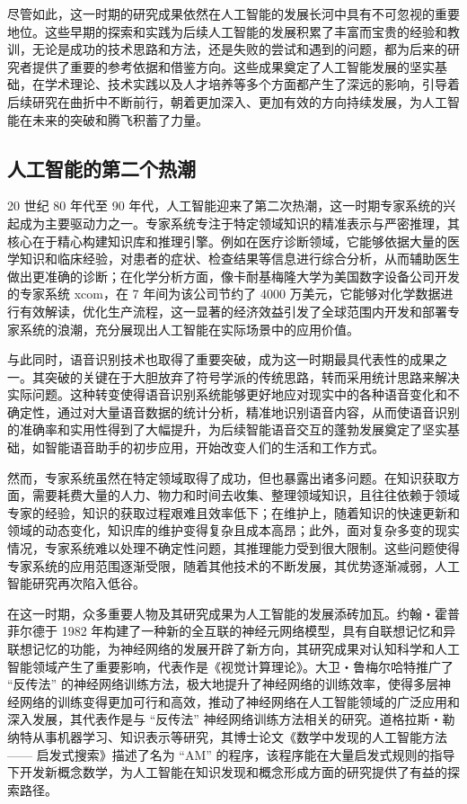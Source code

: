 尽管如此，这一时期的研究成果依然在人工智能的发展长河中具有不可忽视的重要地位。这些早期的探索和实践为后续人工智能的发展积累了丰富而宝贵的经验和教训，无论是成功的技术思路和方法，还是失败的尝试和遇到的问题，都为后来的研究者提供了重要的参考依据和借鉴方向。这些成果奠定了人工智能发展的坚实基础，在学术理论、技术实践以及人才培养等多个方面都产生了深远的影响，引导着后续研究在曲折中不断前行，朝着更加深入、更加有效的方向持续发展，为人工智能在未来的突破和腾飞积蓄了力量。



\subsection{人工智能的第二个热潮}


20 世纪 80 年代至 90 年代，人工智能迎来了第二次热潮，这一时期专家系统的兴起成为主要驱动力之一。专家系统专注于特定领域知识的精准表示与严密推理，其核心在于精心构建知识库和推理引擎。例如在医疗诊断领域，它能够依据大量的医学知识和临床经验，对患者的症状、检查结果等信息进行综合分析，从而辅助医生做出更准确的诊断；在化学分析方面，像卡耐基梅隆大学为美国数字设备公司开发的专家系统 xcom，在 7 年间为该公司节约了 4000 万美元，它能够对化学数据进行有效解读，优化生产流程，这一显著的经济效益引发了全球范围内开发和部署专家系统的浪潮，充分展现出人工智能在实际场景中的应用价值。


与此同时，语音识别技术也取得了重要突破，成为这一时期最具代表性的成果之一。其突破的关键在于大胆放弃了符号学派的传统思路，转而采用统计思路来解决实际问题。这种转变使得语音识别系统能够更好地应对现实中的各种语音变化和不确定性，通过对大量语音数据的统计分析，精准地识别语音内容，从而使语音识别的准确率和实用性得到了大幅提升，为后续智能语音交互的蓬勃发展奠定了坚实基础，如智能语音助手的初步应用，开始改变人们的生活和工作方式。


然而，专家系统虽然在特定领域取得了成功，但也暴露出诸多问题。在知识获取方面，需要耗费大量的人力、物力和时间去收集、整理领域知识，且往往依赖于领域专家的经验，知识的获取过程艰难且效率低下；在维护上，随着知识的快速更新和领域的动态变化，知识库的维护变得复杂且成本高昂；此外，面对复杂多变的现实情况，专家系统难以处理不确定性问题，其推理能力受到很大限制。这些问题使得专家系统的应用范围逐渐受限，随着其他技术的不断发展，其优势逐渐减弱，人工智能研究再次陷入低谷。


在这一时期，众多重要人物及其研究成果为人工智能的发展添砖加瓦。约翰・霍普菲尔德于 1982 年构建了一种新的全互联的神经元网络模型，具有自联想记忆和异联想记忆的功能，为神经网络的发展开辟了新方向，其研究成果对认知科学和人工智能领域产生了重要影响，代表作是《视觉计算理论》。大卫・鲁梅尔哈特推广了 “反传法” 的神经网络训练方法，极大地提升了神经网络的训练效率，使得多层神经网络的训练变得更加可行和高效，推动了神经网络在人工智能领域的广泛应用和深入发展，其代表作是与 “反传法” 神经网络训练方法相关的研究。道格拉斯・勒纳特从事机器学习、知识表示等研究，其博士论文《数学中发现的人工智能方法 —— 启发式搜索》描述了名为 “AM” 的程序，该程序能在大量启发式规则的指导下开发新概念数学，为人工智能在知识发现和概念形成方面的研究提供了有益的探索路径。


